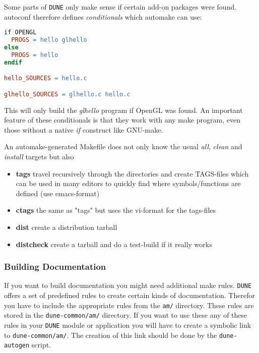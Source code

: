 \documentclass[11pt,a4paper,headinclude,footinclude,DIV16,normalheadings]{scrartcl}
\newcommand{\dune}{\texttt{DUNE}\xspace}
\newcommand{\autogen}{\texttt{dune-autogen}\xspace}
\begin{document}

Some parts of \dune only make sense if certain add-on packages were
found. autoconf therefore defines {\em conditionals} which automake can
use:

\begin{lstlisting}[language=make]
if OPENGL
  PROGS = hello glhello
else
  PROGS = hello
endif

hello_SOURCES = hello.c

glhello_SOURCES = glhello.c hello.c
\end{lstlisting}

This will only build the {\em glhello} program if OpenGL was found. An
important feature of these conditionals is that they work with any
make program, even those without a native {\em if} construct like GNU-make.


An automake-generated Makefile does not only know the usual {\em all},
{\em clean} and {\em install} targets but also
\begin{itemize}
\item {\bf tags} travel recursively through the directories and create
  TAGS-files which can be used in many editors to quickly find where
  symbols/functions are defined (use emacs-format)
\item {\bf ctags} the same as "tags" but uses the vi-format for the tags-files
\item {\bf dist} create a distribution tarball
\item {\bf distcheck} create a tarball and do a test-build if it really works
\end{itemize}

\subsubsection{Building Documentation}
\label{am_includes}

If you want to build documentation you might need additional make
rules. \dune offers a set of predefined rules to create certain kinds
of documentation. Therefor you have to include the appropriate rules
from the \texttt{am/} directory. These rules are stored in the
\texttt{dune-common/am/} directory. If you want to use these any of
these rules in your \dune module or application you will have to
create a symbolic link to \texttt{dune-common/am/}. The creation of
this link should be done by the \autogen script.

\end{document}
